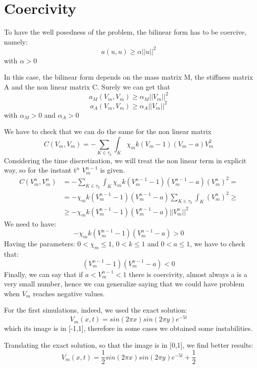 \documentclass[a4paper]{article}
\begin{document}
\section{Coercivity}
To have the well posedness of the problem, the bilinear form has to be coercive, namely:
\begin{equation}
a(u,u) \ge \alpha ||u||^2
\end{equation}
with $\alpha>0$

In this case, the bilinear form depends on the mass matrix M, the stiffness matrix A and the non linear matrix C. Surely we can get that 
\begin{equation}
a_M(V_m,V_m)\ge \alpha_M ||V_m||^2
\end{equation}
\begin{equation}
a_A(V_m,V_m)\ge \alpha_A ||V_m||^2
\end{equation}
with $\alpha_M>0$ and $\alpha_A>0$

We have to check that we can do the same for the non linear matrix
\begin{equation}
C(V_m,V_m) = - \sum_{K \in \tau_h} \int_K \chi_m k(V_m-1)(V_m-a)V_m^2
\end{equation}
Considering the time discretization, we will treat the non linear term in explicit way, so for the instant t$^n$ $V_m^{n-1}$ is given.
\begin{equation}
\begin{split}
C(V_m^n,V_m^n) &= - \sum_{K \in \tau_h} \int_K \chi_m k(V_m^{n-1}-1)(V_m^{n-1}-a)(V_m^{n})^2 = \\
&= - \chi_m k(V_m^{n-1}-1)(V_m^{n-1}-a)\sum_{K \in \tau_h} \int_K (V_m^{n})^2  \ge \\
&\ge - \chi_m k(V_m^{n-1}-1)(V_m^{n-1}-a) ||V_m^{n}||^2
\end{split}
\end{equation}
We need to have:
\begin{equation}
- \chi_m k(V_m^{n-1}-1)(V_m^{n-1}-a)>0
\end{equation}
Having the parameters: $0<\chi_m\le1$, $0<k\le1$ and $0<a\le1$, we have to check that:
\begin{equation}
(V_m^{n-1}-1)(V_m^{n-1}-a) < 0
\end{equation}
Finally, we can say that if $a < V_m^{n-1}< 1$ there is coercivity, almost always a is a very small number, hence we can generalize saying that we could have problem when $V_m$ reaches negative values.

For the first simulations, indeed, we used the exact solution:
\begin{equation}
V_m(x,t)=sin(2 \pi x) sin(2 \pi y) e^{-5t}
\end{equation}
which its image is in [-1,1], therefore in some cases we obtained some instabilities. 

Translating the exact solution, so that the image is in [0,1], we find better results:
\begin{equation}
V_m(x,t)=\frac{1}{2} sin(2 \pi x) sin(2 \pi y) e^{-5 t}+\frac{1}{2}
\end{equation}
\end{document}
